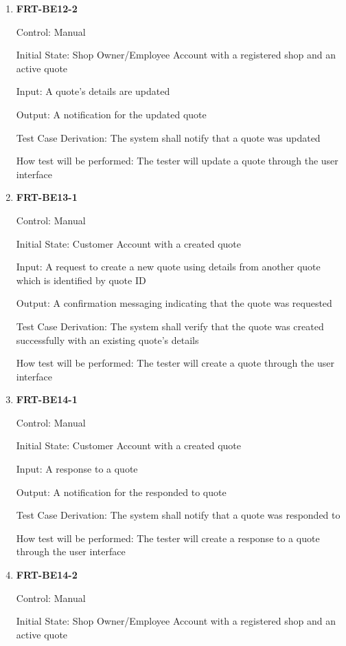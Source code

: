 \documentclass[12pt, titlepage]{article}
\begin{document}
\begin{enumerate}
	\item \textbf{FRT-BE12-2}

	      Control: Manual

	      Initial State: Shop Owner/Employee Account with a registered shop and an active quote

	      Input: A quote's details are updated

	      Output: A notification for the updated quote

	      Test Case Derivation: The system shall notify that a quote was updated

	      How test will be performed: The tester will update a quote through the user interface

	\item \textbf{FRT-BE13-1}

	      Control: Manual

	      Initial State: Customer Account with a created quote

	      Input: A request to create a new quote using details from another quote which is identified by
	      quote ID

	      Output: A confirmation messaging indicating that the quote was requested

	      Test Case Derivation: The system shall verify that the quote was created successfully with an
	      existing quote's details

	      How test will be performed: The tester will create a quote through the user interface

	\item \textbf{FRT-BE14-1}

	      Control: Manual

	      Initial State: Customer Account with a created quote

	      Input: A response to a quote

	      Output: A notification for the responded to quote

	      Test Case Derivation: The system shall notify that a quote was responded to

	      How test will be performed: The tester will create a response to a quote through the user interface

	\item \textbf{FRT-BE14-2}

	      Control: Manual

	      Initial State: Shop Owner/Employee Account with a registered shop and an active quote


\end{enumerate}
\end{document}
